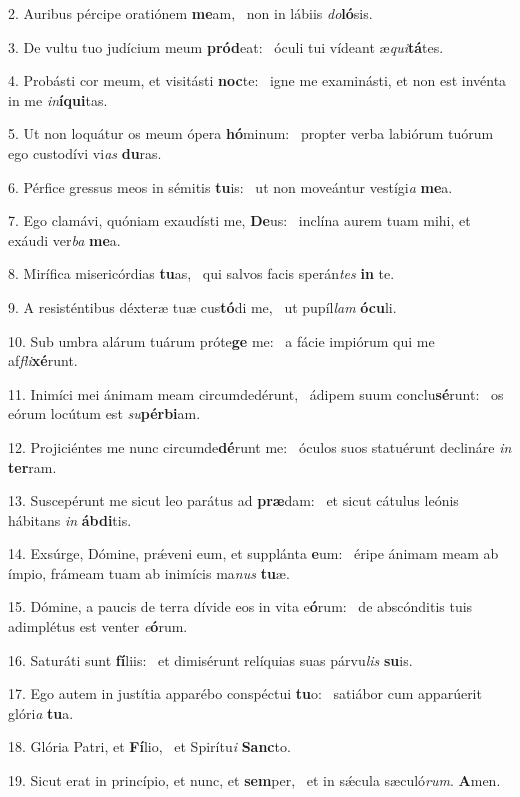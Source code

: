 2. Auribus pércipe oratiónem \textbf{me}am, \ast\  non in lábiis \textit{do}\textbf{ló}sis.\

3. De vultu tuo judícium meum \textbf{pród}eat: \ast\  óculi tui vídeant æ\textit{qui}\textbf{tá}tes.\

4. Probásti cor meum, et visitásti \textbf{noc}te: \ast\  igne me examinásti, et non est invénta in me \textit{in}\textbf{í}\textbf{qui}tas.\

5. Ut non loquátur os meum ópera \textbf{hó}minum: \ast\  propter verba labiórum tuórum ego custodívi vi\textit{as} \textbf{du}ras.\

6. Pérfice gressus meos in sémitis \textbf{tu}is: \ast\  ut non moveántur vestígi\textit{a} \textbf{me}a.\

7. Ego clamávi, quóniam exaudísti me, \textbf{De}us: \ast\  inclína aurem tuam mihi, et exáudi ver\textit{ba} \textbf{me}a.\

8. Mirífica misericórdias \textbf{tu}as, \ast\  qui salvos facis sperán\textit{tes} \textbf{in} te.\

9. A resisténtibus déxteræ tuæ cus\textbf{tó}di me, \ast\  ut pupíl\textit{lam} \textbf{ó}\textbf{cu}li.\

10. Sub umbra alárum tuárum próte\textbf{ge} me: \ast\  a fácie impiórum qui me af\textit{fli}\textbf{xé}runt.\

11. Inimíci mei ánimam meam circumdedérunt, \dag\  ádipem suum conclu\textbf{sé}runt: \ast\  os eórum locútum est \textit{su}\textbf{pér}\textbf{bi}am.\

12. Projiciéntes me nunc circumde\textbf{dé}runt me: \ast\  óculos suos statuérunt declináre \textit{in} \textbf{ter}ram.\

13. Suscepérunt me sicut leo parátus ad \textbf{præ}dam: \ast\  et sicut cátulus leónis hábitans \textit{in} \textbf{áb}\textbf{di}tis.\

14. Exsúrge, Dómine, prǽveni eum, et supplánta \textbf{e}um: \ast\  éripe ánimam meam ab ímpio, frámeam tuam ab inimícis ma\textit{nus} \textbf{tu}æ.\

15. Dómine, a paucis de terra dívide eos in vita e\textbf{ó}rum: \ast\  de abscónditis tuis adimplétus est venter \textit{e}\textbf{ó}rum.\

16. Saturáti sunt \textbf{fí}liis: \ast\  et dimisérunt relíquias suas párvu\textit{lis} \textbf{su}is.\

17. Ego autem in justítia apparébo conspéctui \textbf{tu}o: \ast\  satiábor cum apparúerit glóri\textit{a} \textbf{tu}a.\

18. Glória Patri, et \textbf{Fí}lio, \ast\  et Spirítu\textit{i} \textbf{Sanc}to.\

19. Sicut erat in princípio, et nunc, et \textbf{sem}per, \ast\  et in sǽcula sæculó\textit{rum}. \textbf{A}men.\

